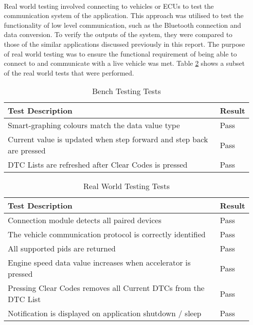 	\paragraph{}{
	Real world testing involved connecting to vehicles or ECUs to test the communication system of the application. This approach was utilised to test the functionality of low level communication, such as the Bluetooth connection and data conversion. To verify the outputs of the system, they were compared to those of the similar applications discussed previously in this report. The purpose of real world testing was to ensure the functional requirement of being able to connect to and communicate with a live vehicle was met. Table \ref{tab:RealTest} shows a subset of the real world tests that were performed.
	
	
	}
	
	\begin{table}[ht]
		\begin{center}				
			\begin{tabularx}{\textwidth}{| X | l |}
				\hline
				\textbf{Test Description} & \textbf{Result}\\
				\hline
				Smart-graphing colours match the data value type & Pass\\
				\hline
				Current value is updated when step forward and step back are pressed & Pass\\
				\hline
				DTC Lists are refreshed after Clear Codes is pressed & Pass\\
				\hline				
			\end{tabularx}
			\caption{Bench Testing Tests}
			\label{tab:BenchTest}
		\end{center}
	\end{table}
	
	\begin{table}[ht]
		\begin{center}				
			\begin{tabularx}{\textwidth}{| X | l |}
				\hline
				\textbf{Test Description} & \textbf{Result}\\
				\hline
				Connection module detects all paired devices & Pass\\
				\hline
				The vehicle communication protocol is correctly identified & Pass\\
				\hline
				All supported pids are returned & Pass\\
				\hline
				Engine speed data value increases when accelerator is pressed & Pass\\
				\hline				
				Pressing Clear Codes removes all Current DTCs from the DTC List & Pass\\
				\hline
				Notification is displayed on application shutdown / sleep & Pass\\
				\hline				
			\end{tabularx}
			\caption{Real World Testing Tests}
			\label{tab:RealTest}
		\end{center}
	\end{table}
	
